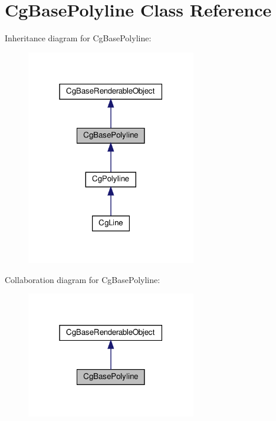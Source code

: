 \hypertarget{class_cg_base_polyline}{}\section{Cg\+Base\+Polyline Class Reference}
\label{class_cg_base_polyline}


Inheritance diagram for Cg\+Base\+Polyline\+:
\nopagebreak
\begin{figure}[H]
\begin{center}
\leavevmode
\includegraphics[width=210pt]{class_cg_base_polyline__inherit__graph}
\end{center}
\end{figure}


Collaboration diagram for Cg\+Base\+Polyline\+:
\nopagebreak
\begin{figure}[H]
\begin{center}
\leavevmode
\includegraphics[width=210pt]{class_cg_base_polyline__coll__graph}
\end{center}
\end{figure}
